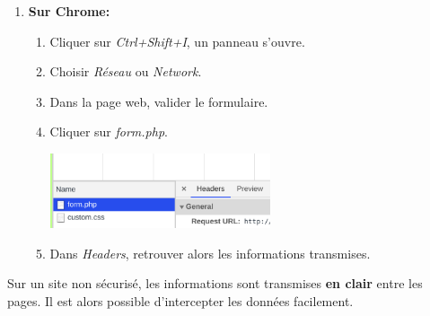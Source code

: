 \documentclass[a4paper,11pt]{article}
\begin{document}
\begin{Form}
\begin{activite}
\begin{enumerate}[resume]
\begin{enumerate}
\end{enumerate}
\item \textbf{Sur Chrome:}
\begin{enumerate}
\item  Cliquer sur \emph{Ctrl+Shift+I}, un panneau s'ouvre.
\item Choisir \emph{Réseau} ou \emph{Network}.
\item Dans la page web, valider le formulaire.
\item Cliquer sur \emph{form.php}.
\begin{center}
\includegraphics[width=6.5cm]{ressources/post-chrome.png}
\end{center}
\item Dans \emph{Headers}, retrouver alors les informations transmises.
\end{enumerate}
\end{enumerate}
\end{activite}
\begin{aretenir}[]
Sur un site non sécurisé, les informations sont transmises \textbf{en clair} entre les pages. Il est alors possible d'intercepter les données facilement.
\end{aretenir}

\end{Form}
\end{document}
